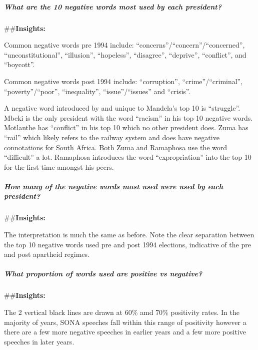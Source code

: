 \documentclass[]{article}
\let\oldsubparagraph\subparagraph
\renewcommand{\subparagraph}[1]{\oldsubparagraph{#1}\mbox{}}
\begin{document}
\hypertarget{what-are-the-10-negative-words-most-used-by-each-president}{%
\subparagraph{\texorpdfstring{\textbf{What are the 10 negative words
most used by each
president?}}{What are the 10 negative words most used by each president?}}\label{what-are-the-10-negative-words-most-used-by-each-president}}

\#\#\textbf{Insights:}

Common negative words pre 1994 include:
``concerns''/``concern''/``concerned'', ``unconstitutional'',
``illusion'', ``hopeless'', ``disagree'', ``deprive'', ``conflict'', and
``boycott''.

Common negative words post 1994 include: ``corruption'',
``crime''/``criminal'', ``poverty''/``poor'', ``inequality'',
``issue''/``issues'' and ``crisis''.

A negative word introduced by and unique to Mandela's top 10 is
``struggle''. Mbeki is the only president with the word ``racism'' in
his top 10 negative words. Motlanthe has ``conflict'' in his top 10
which no other president does. Zuma has ``rail'' which likely refers to
the railway system and does have negative connotations for South Africa.
Both Zuma and Ramaphosa use the word ``difficult'' a lot. Ramaphosa
introduces the word ``expropriation'' into the top 10 for the first time
amongst his peers.

\hypertarget{how-many-of-the-negative-words-most-used-were-used-by-each-president}{%
\subparagraph{\texorpdfstring{\textbf{How many of the negative words
most used were used by each
president?}}{How many of the negative words most used were used by each president?}}\label{how-many-of-the-negative-words-most-used-were-used-by-each-president}}

\#\#\textbf{Insights:}

The interpretation is much the same as before. Note the clear separation
between the top 10 negative words used pre and post 1994 elections,
indicative of the pre and post apartheid regimes.

\hypertarget{what-proportion-of-words-used-are-positive-vs-negative}{%
\subparagraph{\texorpdfstring{\textbf{What proportion of words used are
positive vs
negative?}}{What proportion of words used are positive vs negative?}}\label{what-proportion-of-words-used-are-positive-vs-negative}}

\#\#\textbf{Insights:}

The 2 vertical black lines are drawn at 60\% amd 70\% positivity rates.
In the majority of years, SONA speeches fall within this range of
positivity however a there are a few more negative speeches in earlier
years and a few more positive speeches in later years.
\end{document}
